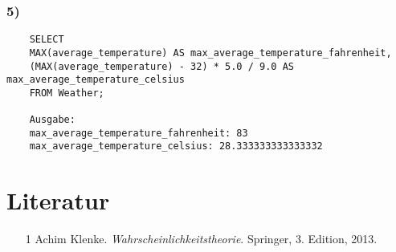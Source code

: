 \documentclass[12pt,a4paper]{article}
\begin{document}
\subsubsection{5)}
\begin{verbatim}
    SELECT 
    MAX(average_temperature) AS max_average_temperature_fahrenheit,
    (MAX(average_temperature) - 32) * 5.0 / 9.0 AS max_average_temperature_celsius
    FROM Weather;

    Ausgabe:
    max_average_temperature_fahrenheit: 83
    max_average_temperature_celsius: 28.333333333333332
\end{verbatim}
\newpage
\section*{Literatur}

\begin{itemize}
    \item[1] Achim Klenke. \textit{Wahrscheinlichkeitstheorie}. Springer, 3. Edition, 2013.
\end{itemize}
\end{document}
